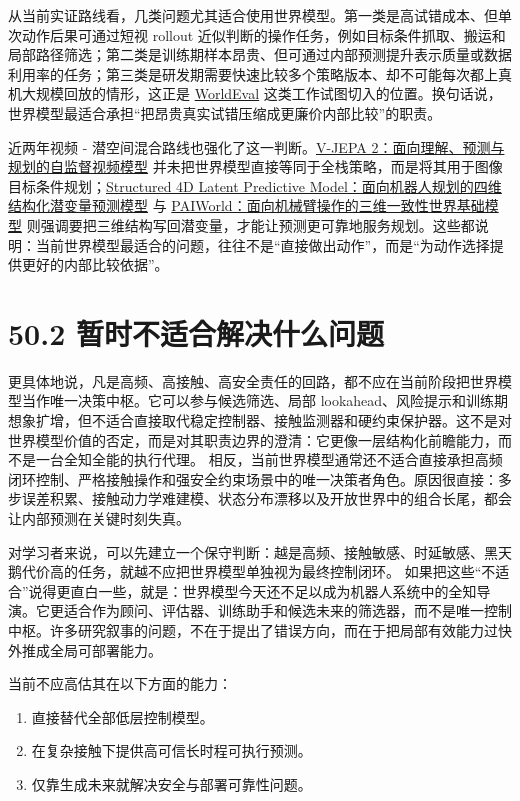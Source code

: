 从当前实证路线看，几类问题尤其适合使用世界模型。第一类是高试错成本、但单次动作后果可通过短视 rollout 近似判断的操作任务，例如目标条件抓取、搬运和局部路径筛选；第二类是训练期样本昂贵、但可通过内部预测提升表示质量或数据利用率的任务；第三类是研发期需要快速比较多个策略版本、却不可能每次都上真机大规模回放的情形，这正是 \href{https://arxiv.org/abs/2505.19017}{WorldEval} 这类工作试图切入的位置。换句话说，世界模型最适合承担“把昂贵真实试错压缩成更廉价内部比较”的职责。

近两年视频 - 潜空间混合路线也强化了这一判断。\href{https://arxiv.org/abs/2506.09985}{V-JEPA 2：面向理解、预测与规划的自监督视频模型} 并未把世界模型直接等同于全栈策略，而是将其用于图像目标条件规划；\href{https://arxiv.org/abs/2607.01166}{Structured 4D Latent Predictive Model：面向机器人规划的四维结构化潜变量预测模型} 与 \href{https://arxiv.org/abs/2606.18375}{PAIWorld：面向机械臂操作的三维一致性世界基础模型} 则强调要把三维结构写回潜变量，才能让预测更可靠地服务规划。这些都说明：当前世界模型最适合的问题，往往不是“直接做出动作”，而是“为动作选择提供更好的内部比较依据”。

\section*{50.2 暂时不适合解决什么问题}


更具体地说，凡是高频、高接触、高安全责任的回路，都不应在当前阶段把世界模型当作唯一决策中枢。它可以参与候选筛选、局部 lookahead、风险提示和训练期想象扩增，但不适合直接取代稳定控制器、接触监测器和硬约束保护器。这不是对世界模型价值的否定，而是对其职责边界的澄清：它更像一层结构化前瞻能力，而不是一台全知全能的执行代理。 相反，当前世界模型通常还不适合直接承担高频闭环控制、严格接触操作和强安全约束场景中的唯一决策者角色。原因很直接：多步误差积累、接触动力学难建模、状态分布漂移以及开放世界中的组合长尾，都会让内部预测在关键时刻失真。

对学习者来说，可以先建立一个保守判断：越是高频、接触敏感、时延敏感、黑天鹅代价高的任务，就越不应把世界模型单独视为最终控制闭环。 如果把这些“不适合”说得更直白一些，就是：世界模型今天还不足以成为机器人系统中的全知导演。它更适合作为顾问、评估器、训练助手和候选未来的筛选器，而不是唯一控制中枢。许多研究叙事的问题，不在于提出了错误方向，而在于把局部有效能力过快外推成全局可部署能力。

当前不应高估其在以下方面的能力：

\begin{enumerate}
\item 直接替代全部低层控制模型。
\item 在复杂接触下提供高可信长时程可执行预测。
\item 仅靠生成未来就解决安全与部署可靠性问题。
\end{enumerate}


